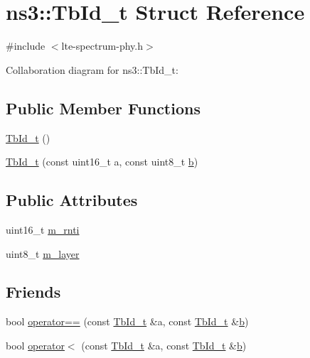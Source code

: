 \hypertarget{structns3_1_1TbId__t}{}\section{ns3\+:\+:Tb\+Id\+\_\+t Struct Reference}
\label{structns3_1_1TbId__t}


{\ttfamily \#include $<$lte-\/spectrum-\/phy.\+h$>$}



Collaboration diagram for ns3\+:\+:Tb\+Id\+\_\+t\+:
\subsection*{Public Member Functions}
\begin{DoxyCompactItemize}
\item 
\hyperlink{structns3_1_1TbId__t_a99046229a9edf212d5a188d64870c8c0}{Tb\+Id\+\_\+t} ()
\item 
\hyperlink{structns3_1_1TbId__t_a99db809963477443f526df3968b04187}{Tb\+Id\+\_\+t} (const uint16\+\_\+t a, const uint8\+\_\+t \hyperlink{lte__pathloss_8m_a21ad0bd836b90d08f4cf640b4c298e7c}{b})
\end{DoxyCompactItemize}
\subsection*{Public Attributes}
\begin{DoxyCompactItemize}
\item 
uint16\+\_\+t \hyperlink{structns3_1_1TbId__t_ad6668ec8859e597f95dc4c1b8dc2cc95}{m\+\_\+rnti}
\item 
uint8\+\_\+t \hyperlink{structns3_1_1TbId__t_a92aa1227d4d0c9d71f0f3e592b6a9ebf}{m\+\_\+layer}
\end{DoxyCompactItemize}
\subsection*{Friends}
\begin{DoxyCompactItemize}
\item 
bool \hyperlink{structns3_1_1TbId__t_af5580776dd9b5f3bbd24d5f9e0619e15}{operator==} (const \hyperlink{structns3_1_1TbId__t}{Tb\+Id\+\_\+t} \&a, const \hyperlink{structns3_1_1TbId__t}{Tb\+Id\+\_\+t} \&\hyperlink{lte__pathloss_8m_a21ad0bd836b90d08f4cf640b4c298e7c}{b})
\item 
bool \hyperlink{structns3_1_1TbId__t_a70f192e5c8be43cd95a1155f9650a8eb}{operator$<$} (const \hyperlink{structns3_1_1TbId__t}{Tb\+Id\+\_\+t} \&a, const \hyperlink{structns3_1_1TbId__t}{Tb\+Id\+\_\+t} \&\hyperlink{lte__pathloss_8m_a21ad0bd836b90d08f4cf640b4c298e7c}{b})
\end{DoxyCompactItemize}


